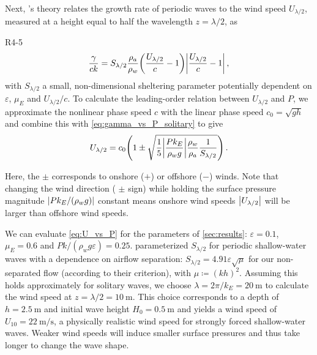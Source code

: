 \documentclass{jfm}
\renewcommand*{\epsilon}{\varepsilon}
\begin{document}
Next, \citeauthor{jeffreys1925formation}'s
\citeyearpar{jeffreys1925formation} theory relates the growth rate of
periodic waves to the wind speed $U_{\lambda/2}$,
measured at a height equal to half the wavelength $z=\lambda/2$, as
\begin{LineLabel}{R4-5}
\begin{equation}
  \frac{\gamma}{c k} = S_{\lambda/2} \frac{\rho_a}{\rho_w}
    \pqty{\frac{U_{\lambda/2}}{c}-1}
    \abs{\frac{U_{\lambda/2}}{c}-1} \,,
  \label{eq:gamma_vs_u_jeffreys}
\end{equation}
with $S_{\lambda/2}$ a small, non-dimensional sheltering parameter
potentially dependent on $\epsilon$, $\mu_E$ and $U_{\lambda/2}/c$.
To calculate the leading-order relation between $U_{\lambda/2}$ and $P$,
we approximate the nonlinear phase speed $c$ with the linear phase speed
$c_0 = \sqrt{gh}$ and combine this with \cref{eq:gamma_vs_P_solitary} to
give
\begin{equation}
  U_{\lambda/2} = c_0 \pqty{1 \pm \sqrt{\frac{1}{5} \abs{\frac{P k_E}{\rho_w g}}
    \frac{\rho_w}{\rho_a} \frac{1}{S_{\lambda/2}}}} \,.
  \label{eq:U_vs_P}
\end{equation}
\end{LineLabel}
Here, the $\pm$ corresponds to onshore ($+$) or offshore ($-$) winds.
Note that changing the wind direction (\ie{} $\pm$ sign) while holding
the surface pressure magnitude $\abs{Pk_E/(\rho_w g)}$ constant means
onshore wind speeds $\abs{U_{\lambda/2}}$ will be larger than offshore
wind speeds.

We can evaluate \cref{eq:U_vs_P} for the parameters of
\cref{sec:results}: $\epsilon=0.1$, $\mu_E = 0.6$ and $Pk/(\rho_w g
\epsilon) = 0.25$.
 parameterized $S_{\lambda/2}$ for
periodic shallow-water waves with a dependence on airflow separation:
$S_{\lambda/2} = 4.91 \epsilon \sqrt{\mu}$ for our non-separated
flow (according to their criterion), with $\mu \coloneqq (kh)^2$.
Assuming this holds approximately for solitary waves, we choose $\lambda
= 2 \pi/k_E = \SI{20}{\meter}$ to calculate the wind speed at $z
= \lambda/2 = \SI{10}{\meter}$.
This choice corresponds to a depth of $h = \SI{2.5}{\meter}$ and initial
wave height $H_0 = \SI{0.5}{\meter}$ and yields a wind speed of $U_{10}
= \SI{22}{\meter\per\second}$, a physically realistic wind speed for
strongly forced shallow-water waves.
Weaker wind speeds will induce smaller surface pressures and thus take
longer to change the wave shape.
\end{document}
